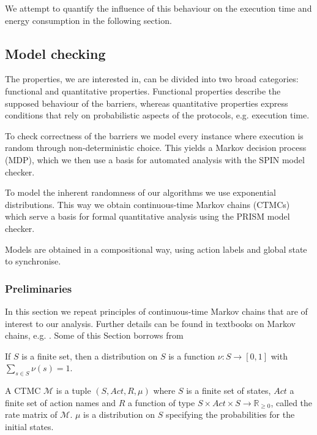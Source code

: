 \documentclass[a4paper, 10pt]{article}
\begin{document}
We attempt to quantify the influence of this behaviour on the execution time and energy consumption in the following section.

\subsection{Model checking}
\label{ssec:analysis-modelchecking}
The properties, we are interested in, can be divided into two broad categories: functional and quantitative properties. Functional properties describe the supposed behaviour of the barriers, whereas quantitative properties express conditions that rely on probabilistic aspects of the protocols, e.g. execution time.

To check correctness of the barriers we model every instance where execution is random through non-deterministic choice. This yields a Markov decision process (MDP), which we then use a basis for automated analysis with the SPIN model checker.

To model the inherent randomness of our algorithms we use exponential distributions. This way we obtain continuous-time Markov chains (CTMCs) which serve a basis for formal quantitative analysis using the PRISM model checker.

Models are obtained in a compositional way, using action labels and global state to synchronise.

\subsubsection{Preliminaries}
\label{sssec:analysis-modelchecking-preliminaries}
In this section we repeat principles of continuous-time Markov chains that are of interest to our analysis. Further details can be found in textbooks on Markov chains, e.g. \cite{kul95, ks76}. Some of this Section borrows from \cite{bai13}

If $S$ is a finite set, then a distribution on $S$ is a function $\nu:S \rightarrow [0,1]$ with $\sum\limits_{s \in S} \nu (s) = 1$.

A CTMC $\mathcal{M}$ is a tuple $(S, \mathit{Act}, R, \mu)$ where $S$ is a finite set of states, $Act$ a finite set of action names and $R$ a function of type $S \times \mathit{Act} \times S \rightarrow \mathbb{R}_{\ge 0}$, called the rate matrix of $\mathcal{M}$. $\mu$ is a distribution on $S$ specifying the probabilities for the initial states.
\end{document}
